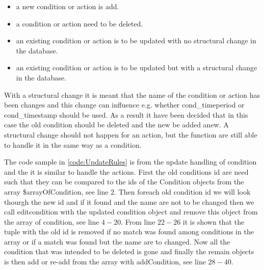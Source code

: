 \begin{itemize}
	\item a new condition or action is add.
	\item a condition or action need to be deleted.
	\item an existing condition or action is to be updated with no structural change in the database.
	\item an existing condition or action is to be updated but with a structural change in the database.
\end{itemize}

With a structural change it is meant that the name of the condition or action has been changes and this change can influence e.g. whether cond\_timeperiod or cond\_timestamp should be used. As a result it have been decided that in this case the old condition should be deleted and the new be added anew. A structural change should not happen for an action, but the function are still able to handle it in the same way as a condition.

The code sample in \ref{code:UpdateRules} is from the update handling of condition and the it is similar to handle the actions. First the old conditions id are need such that they can be compared to the ids of the Condition objects from the array \$arrayOfCondition, see line $2$. 
Then foreach old condition id we will look thourgh the new id and if it found and the name are not to be changed then we call editcondition with the updated condition object and remove this object from the array of condition, see line $4-20$. 
From line $22-26$ it is shown that the tuple with the old id is removed if no match was found among conditions in the array or if a match was found but the name are to changed. Now all the condition that was intended to be deleted is gone and finally the remain objects is then add or re-add from the array with addCondition, see line $28-40$.


